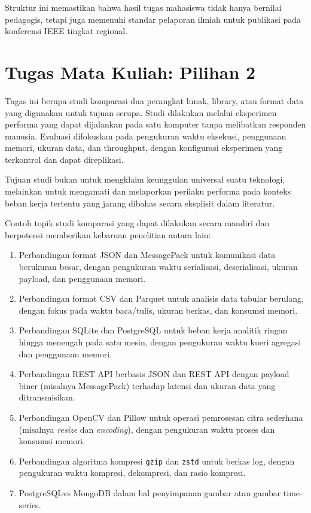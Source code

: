 Struktur ini memastikan bahwa hasil tugas mahasiswa tidak hanya bernilai pedagogis, tetapi juga memenuhi standar pelaporan ilmiah untuk publikasi pada konferensi IEEE tingkat regional.


\section*{Tugas Mata Kuliah: Pilihan 2}

Tugas ini berupa studi komparasi dua perangkat lunak, library, atau format data yang digunakan untuk tujuan serupa. Studi dilakukan melalui eksperimen performa yang dapat dijalankan pada satu komputer tanpa melibatkan responden manusia. Evaluasi difokuskan pada pengukuran waktu eksekusi, penggunaan memori, ukuran data, dan throughput, dengan konfigurasi eksperimen yang terkontrol dan dapat direplikasi.

Tujuan studi bukan untuk mengklaim keunggulan universal suatu teknologi, melainkan untuk mengamati dan melaporkan perilaku performa pada konteks beban kerja tertentu yang jarang dibahas secara eksplisit dalam literatur.

Contoh topik studi komparasi yang dapat dilakukan secara mandiri dan berpotensi memberikan kebaruan penelitian antara lain:
\begin{enumerate}
    \item Perbandingan format JSON dan MessagePack untuk komunikasi data berukuran besar, dengan pengukuran waktu serialisasi, deserialisasi, ukuran payload, dan penggunaan memori.
    \item Perbandingan format CSV dan Parquet untuk analisis data tabular berulang, dengan fokus pada waktu baca/tulis, ukuran berkas, dan konsumsi memori.
    \item Perbandingan SQLite dan PostgreSQL untuk beban kerja analitik ringan hingga menengah pada satu mesin, dengan pengukuran waktu kueri agregasi dan penggunaan memori.
    \item Perbandingan REST API berbasis JSON dan REST API dengan payload biner (misalnya MessagePack) terhadap latensi dan ukuran data yang ditransmisikan.
    \item Perbandingan OpenCV dan Pillow untuk operasi pemrosesan citra sederhana (misalnya \textit{resize} dan \textit{encoding}), dengan pengukuran waktu proses dan konsumsi memori.
    \item Perbandingan algoritma kompresi \texttt{gzip} dan \texttt{zstd} untuk berkas log, dengan pengukuran waktu kompresi, dekompresi, dan rasio kompresi.
	\item PostgreSQLvs MongoDB dalam hal penyimpanan gambar atau gambar time-series.
\end{enumerate}


